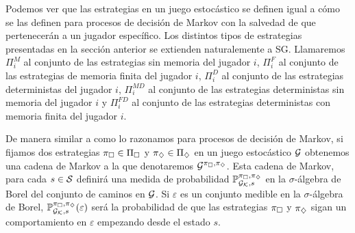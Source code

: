 Podemos ver que las estrategias en un juego estocástico se definen igual a cómo
se las definen para procesos de decisión de Markov con la salvedad de que
pertenecerán a un jugador específico. Los distintos tipos de estrategias
presentadas en la sección anterior se extienden naturalemente a SG. Llamaremos
$\Pi^{M}_i$ al conjunto de las estrategias sin memoria del jugador $i$,
$\Pi^{F}_i$ al conjunto de las estrategias de memoria finita del jugador $i$,
$\Pi^{D}_i$ al conjunto de las estrategias deterministas del jugador $i$,
$\Pi^{MD}_i$ al conjunto de las estrategias deterministas sin memoria del
jugador $i$ y $\Pi^{FD}_i$ al conjunto de las estrategias deterministas con
memoria finita del jugador $i$.

De manera similar a como lo razonamos para procesos de decisión de Markov, si
fijamos dos estrategias $\pi_\square \in \Pi_\square$ y $\pi_\diamondsuit \in \Pi_\diamondsuit$
en un juego estocástico $\mathcal{G}$ obtenemos una cadena de Markov a la que
denotaremos $\mathcal{G}^{\pi_\square, \pi_\diamondsuit}$. Esta cadena de Markov, para cada $s \in
	\mathcal{S}$ definirá una medida de probabilidad $\mathbb{P}_{\mathcal{G}_{\mathcal{K}}, s}^{\pi_\square, \pi_\diamondsuit}$ en la $\sigma$-álgebra de
Borel del conjunto de caminos en $\mathcal{G}$. Si $\varepsilon$ es un conjunto medible
en la $\sigma$-álgebra de Borel, $\mathbb{P}_{\mathcal{G}_{\mathcal{K}}, s}^{\pi_\square, \pi_\diamondsuit}(\varepsilon)$ será la probabilidad de
que las estrategias $\pi_\square$ y $\pi_\diamondsuit$ sigan un comportamiento en
$\varepsilon$ empezando desde el estado $s$.






